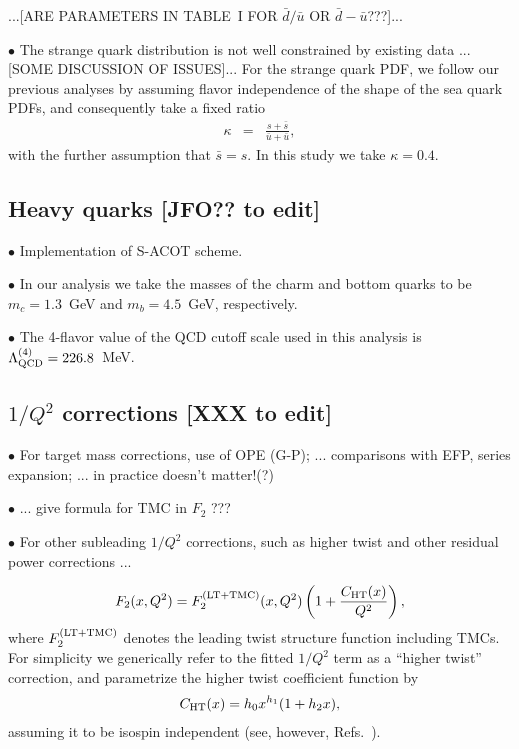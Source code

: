 \documentclass[aps,prd,amsmath,preprint]{revtex4}
\begin{document}
{\color{red} ...[ARE PARAMETERS IN TABLE~I FOR $\bar d / \bar u$
OR $\bar d - \bar u$???]...}




$\bullet$
The strange quark distribution is not well constrained by existing
data ...[SOME DISCUSSION OF ISSUES]...
%
For the strange quark PDF, we follow our previous analyses
\cite{CJ11, CJ12} by assuming flavor independence of the shape
of the sea quark PDFs, and consequently take a fixed ratio
%
\begin{eqnarray}
\kappa
&=& \frac{s + \bar s}{\bar u + \bar u},
\label{eq:kappa}
\end{eqnarray}
%
with the further assumption that $\bar s = s$.
In this study we take $\kappa = 0.4$.


\subsection{Heavy quarks {\color{red} [JFO?? to edit]}}
\label{ssec:HQs}

$\bullet$
Implementation of S-ACOT scheme.


$\bullet$
In our analysis we take the masses of the charm and bottom quarks
to be $m_c = 1.3$~GeV and $m_b = 4.5$~GeV, respectively.


$\bullet$
The 4-flavor value of the QCD cutoff scale used in this analysis is
$\Lambda_{\rm QCD}^{(4)} = 226.8$~MeV.


\subsection{$1/Q^2$ corrections {\color{red} [XXX to edit]}}
\label{ssec:power}

$\bullet$
For target mass corrections, use of OPE (G-P);
... comparisons with EFP, series expansion;
... in practice doesn't matter!(?)


$\bullet$
... give formula for TMC in $F_2$ ???


$\bullet$
For other subleading $1/Q^2$ corrections, such as higher twist and
other residual power corrections ...


%
\begin{align}
F_2(x,Q^2)
= F_2^{(\rm LT+TMC)}(x,Q^2)
  \left( 1 + \frac{C_{\rm HT}(x)}{Q^2} \right),
\label{eq:F2ht}
\end{align}
%
where $F_2^{\rm (LT+TMC)}$ denotes the leading twist structure function
including TMCs.  For simplicity we generically refer to the fitted
$1/Q^2$ term as a ``higher twist'' correction, and parametrize the
higher twist coefficient function by
%
\begin{align}
C_{\rm HT}(x) = h_0 x^{h_1} (1+h_2 x),
\label{eq:C_ht}
\end{align}
%
assuming it to be isospin independent
(see, however, Refs.~\cite{Vir92, AKL03, BB08, Blu12}).
\end{document}
